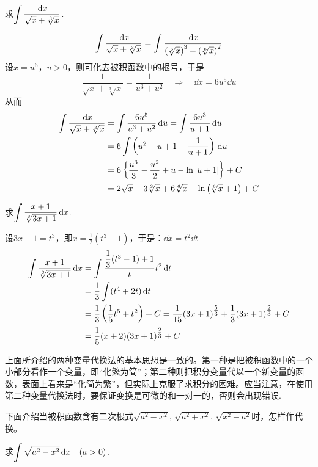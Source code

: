 \begin{example}
    求$\displaystyle\int\dfrac{\,{\rm d} x}{\sqrt{x}+\sqrt[3]{x}}$.
\end{example}

\begin{solution}
    \[\displaystyle\int\dfrac{\,{\rm d} x}{\sqrt{x}+\sqrt[3]{x}}=\int \dfrac{\,{\rm d} x}{\left(\sqrt[6]{x}\right)^3+\left(\sqrt[6]{x}\right)^2}\]
设$x=u^6$，$u>0$，则可化去被积函数中的根号，于是
\[\frac{1}{\sqrt{x}+\sqrt[3]{x}}=\frac{1}{u^3+u^2}\quad \Rightarrow\quad \dd x=6u^5\dd u\]
从而
\[\begin{split}
    \displaystyle\int\dfrac{\,{\rm d} x}{\sqrt{x}+\sqrt[3]{x}}&=\int \dfrac{6u^5}{u^3+u^2}\,{\rm d} u=\int\dfrac{6u^3}{u+1}\,{\rm d} u\\
    &=6\int \left(u^2-u+1-\dfrac{1}{u+1}\right)\,{\rm d} u\\
    &=6\left\{\dfrac{u^3}{3}-\dfrac{u^2}{2}+u-\ln|u+1|\right\}+C\\
    &=2\sqrt{x}-3\sqrt[3]{x}+6\sqrt[6]{x}-\ln\left(\sqrt[6]{x}+1\right)+C
\end{split}
    \]
\end{solution}

\begin{example}
    求$\displaystyle\int \dfrac{x+1}{\sqrt[3]{3x+1}}\,{\rm d} x$.
\end{example}

\begin{solution}
    设$3x+1=t^3$，即$x=\frac{1}{2}(t^3-1)$，于是：$\dd x=t^2\dd t$
\[\begin{split}
    \displaystyle\int \dfrac{x+1}{\sqrt[3]{3x+1}}\,{\rm d} x&=\int \dfrac{\dfrac{1}{3}(t^3-1)+1}{t}t^2\,{\rm d} t\\
&=\dfrac{1}{3}\int (t^4+2t)\,{\rm d} t\\
&=\dfrac{1}{3}\left(\dfrac{1}{5}t^5+t^2\right)+C=\dfrac{1}{15}(3x+1)^{\tfrac{5}{3}}+\dfrac{1}{3}(3x+1)^{\tfrac{2}{3}}+C\\
&=\dfrac{1}{5}(x+2)(3x+1)^{\tfrac{2}{3}}+C
\end{split}\]
\end{solution}

上面所介绍的两种变量代换法的基本思想是一致的。第一种是把被积函数中的一个小部分看作一个变量，即“化繁为简”；第二种则把积分变量代以一个新变量的函数，表面上看来是“化简为繁”，但实际上克服了求积分的困难。应当注意，在使用第二种变量代换法时，要保证变换是可微的和一对一的，否则会出现错误.

下面介绍当被积函数含有二次根式$\sqrt{a^2-x^2}$, $\sqrt{a^2+x^2}$, $\sqrt{x^2-a^2}$时，怎样作代换。

\begin{example}
    求$\displaystyle\int \sqrt{a^2-x^2}\,{\rm d} x\quad (a>0)$.
\end{example}

